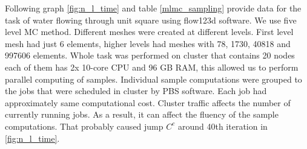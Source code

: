 \documentclass{article}
\begin{document}
\break
Following graph \ref{fig:n_l_time} and table \ref{mlmc_sampling} provide data for the task of water flowing through unit square using flow123d \cite{flow123d} software. We use five level MC method. Different meshes were created at different levels. First level mesh had just 6 elements, higher levels had meshes with 78, 1730, 40818 and 997606 elements. Whole task was performed on cluster that contains 20 nodes each of them has 2x 10-core CPU and 96 GB RAM, this allowed us to perform parallel computing of samples. Individual sample computations were grouped to the jobs that were scheduled in cluster by PBS software. Each job had approximately same computational cost. Cluster traffic affects the number of currently running jobs. As a result, it can affect the fluency of the sample computations. That probably caused jump $C^c$ around 40th iteration in \ref{fig:n_l_time}.
\end{document}
